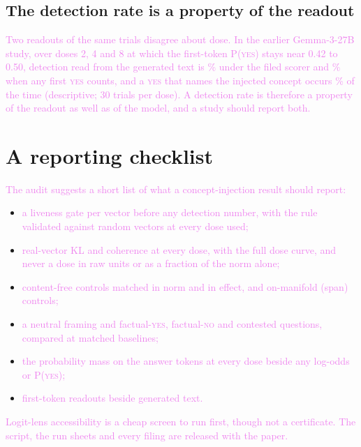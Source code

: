 \documentclass[11pt,a4paper]{article}
\newcommand{\pyes}{P(\textup{\textsc{yes}})}
\newcommand{\yes}{\textup{\textsc{yes}}}
\newcommand{\no}{\textup{\textsc{no}}}
\newcommand{\draft}[1]{\textcolor{violet}{#1}}
\begin{document}
\subsection{The detection rate is a property of the readout}
\label{sec:readout}
\draft{Two readouts of the same trials disagree about dose. In the earlier Gemma-3-27B study, over
doses 2, 4 and 8 at which the first-token \pyes{} stays near 0.42 to 0.50, detection read from the
generated text is \sthreeFiled{}\% under the filed scorer and \sthreeYes{}\% when any first \yes{}
counts, and a \yes{} that names the injected concept occurs \sthreeNamed{}\% of the time
(descriptive; 30 trials per dose). A detection rate is therefore a property of the readout as well as of the model,
and a study should report both.}

\section{A reporting checklist}
\label{sec:checklist}
\draft{The audit suggests a short list of what a concept-injection result should report:}
\begin{itemize}
  \item \draft{a liveness gate per vector before any detection number, with the rule validated
  against random vectors at every dose used;}
  \item \draft{real-vector KL and coherence at every dose, with the full dose curve, and never a
  dose in raw units or as a fraction of the norm alone;}
  \item \draft{content-free controls matched in norm and in effect, and on-manifold (span)
  controls;}
  \item \draft{a neutral framing and factual-\yes{}, factual-\no{} and contested questions, compared
  at matched baselines;}
  \item \draft{the probability mass on the answer tokens at every dose beside any log-odds or
  \pyes{};}
  \item \draft{first-token readouts beside generated text.}
\end{itemize}
\draft{Logit-lens accessibility is a cheap screen to run first, though not a certificate. The
script, the run sheets and every filing are released with the paper.}

\end{document}
